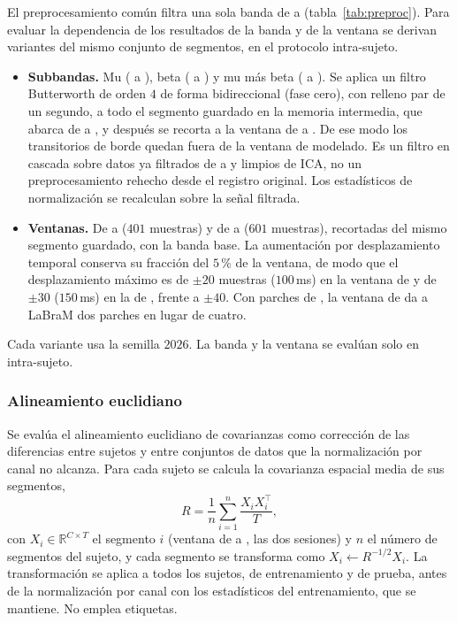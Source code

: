 El preprocesamiento común filtra una sola banda de  a 
(tabla~\ref{tab:preproc}). Para evaluar la dependencia de los resultados de la banda y de
la ventana se derivan variantes del mismo conjunto de segmentos, en el protocolo
intra-sujeto.

\begin{itemize}
  \item \textbf{Subbandas.} Mu ( a ), beta ( a ) y mu más beta
  ( a ). Se aplica un filtro Butterworth de orden $4$ de forma bidireccional (fase cero), con relleno par de un segundo, a todo el segmento guardado en
  la memoria intermedia, que abarca de  a , y después se recorta a la
  ventana de  a . De ese modo los transitorios de borde quedan fuera de la
  ventana de modelado. Es un filtro en cascada sobre datos ya filtrados de  a
   y limpios de ICA, no un preprocesamiento rehecho desde el registro original. Los
  estadísticos de normalización se recalculan sobre la señal filtrada.
  \item \textbf{Ventanas.} De  a  ($401$ muestras) y de  a 
  ($601$ muestras), recortadas del mismo segmento guardado, con la banda base. La
  aumentación por desplazamiento temporal conserva su fracción del $5$\,\% de la ventana,
  de modo que el desplazamiento máximo es de $\pm 20$ muestras ($100$\,ms) en la ventana de
   y de $\pm 30$ ($150$\,ms) en la de , frente a $\pm 40$. Con parches de
  , la ventana de  da a LaBraM dos parches en lugar de cuatro.
\end{itemize}

Cada variante usa la semilla $2026$. La banda y la ventana se evalúan solo en intra-sujeto.

\subsubsection{Alineamiento euclidiano}
\label{sec:variantes-ea}

Se evalúa el alineamiento euclidiano de covarianzas \cite{he2020ea} como corrección de las
diferencias entre sujetos y entre conjuntos de datos que la normalización por canal no
alcanza. Para cada sujeto se calcula la covarianza espacial media de sus segmentos,
\begin{equation}
  R = \frac{1}{n}\sum_{i=1}^{n}\frac{X_i X_i^{\top}}{T},
\end{equation}
con $X_i \in \mathbb{R}^{C \times T}$ el segmento $i$ (ventana de  a , las
dos sesiones) y $n$ el número de segmentos del sujeto, y cada segmento se transforma como
$X_i \leftarrow R^{-1/2} X_i$. La transformación se aplica a todos los sujetos, de
entrenamiento y de prueba, antes de la normalización por canal con los estadísticos del
entrenamiento, que se mantiene. No emplea etiquetas.

